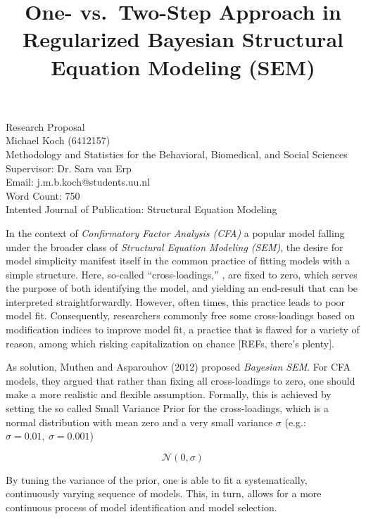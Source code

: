 \documentclass[
  english,
  man]{apa6}
\title{One- vs.~Two-Step Approach in Regularized Bayesian Structural Equation Modeling (SEM)}
\author{\phantom{0}}
\date{}
\affiliation{\phantom{0}}
\begin{document}
\maketitle


\vfill
Research Proposal \\
Michael Koch (6412157)\\
Methodology and Statistics for the Behavioral, Biomedical, and Social Sciences \\
Supervisor: Dr. Sara van Erp \\ 
Email: j.m.b.koch@students.uu.nl \\
Word Count: 750 \\
Intented Journal of Publication: Structural Equation Modeling

\setcounter{page}{0}
\thispagestyle{empty}
\pagestyle{plain}

\clearpage

In the context of \emph{Confirmatory Factor Analysis (CFA)} a popular model falling under the broader class of \emph{Structural Equation Modeling (SEM)}, the desire for model simplicity manifest itself in the common practice of fitting models with a simple structure. Here, so-called ``cross-loadings,'' , are fixed to zero, which serves the purpose of both identifying the model, and yielding an end-result that can be interpreted straightforwardly. However, often times, this practice leads to poor model fit. Consequently, researchers commonly free some cross-loadings based on modification indices to improve model fit, a practice that is flawed for a variety of reason, among which risking capitalization on chance {[}REFs, there's plenty{]}.

As solution, Muthen and Asparouhov (2012) proposed \emph{Bayesian SEM}. For CFA models, they argued that rather than fixing all cross-loadings to zero, one should make a more realistic and flexible assumption.
Formally, this is achieved by setting the so called Small Variance Prior for the cross-loadings, which is a normal distribution with mean zero and a very small variance \(\sigma\) (e.g.: \(\sigma = 0.01, \  \sigma = 0.001\))

\[\mathcal{N}(0, \sigma)\]

By tuning the variance of the prior, one is able to fit a systematically, continuously varying sequence of models. This, in turn, allows for a more continuous process of model identification and model selection.
\end{document}
